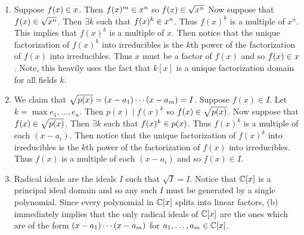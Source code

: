 \documentclass[letterpaper, 11pt, oneside]{book}
\begin{document}
\begin{sol}\label{ex:UAG_1.1.7}
  \begin{enumerate}
    \item Suppose $f(x) \in \ideal{x}$.
          Then $f(x)^{m} \in \ideal{x^{n}}$ so $f(x) \in \sqrt{\ideal{x^{n}}}$
          Now suppose that $f(x) \in \sqrt{\ideal{x^{n}}}$.
          Then $\exists k$ such that $f(x)^{k} \in \ideal{x^{n}}$.
          Thus $f(x)^{k}$ is a multiple of $x^{n}$.
          This implies that $f(x)^{k}$ is a multiple of $x$.
          Then notice that the unique factorization of $f(x)^{k}$ into irreducibles is the $k$th power of the factorization of $f(x)$ into irreducibles.
          Thus $x$ must be a factor of $f(x)$ and so $f(x) \in \ideal{x}$.
          Note, this heavily uses the fact that $k[x]$ is a unique factorization domain for all fields $k$.
    \item We claim that $\sqrt{\ideal{p(x)}} = \ideal{(x - a_{1}) \cdots (x - a_{m})} = I$.
          Suppose $f(x) \in I$.
          Let $k = \max{e_{1}, \ldots, e_{n}}$.
          Then $p(x) \mid f(x)^{k}$ so $f(x) \in \sqrt{\ideal{p(x)}}$.
          Now suppose that $f(x) \in \sqrt{\ideal{p(x)}}$.
          Then $\exists k$ such that $f(x)^{k} \in \ideal{p(x)}$.
          Thus $f(x)^{k}$ is a multiple of each $(x - a_{i})$.
          Then notice that the unique factorization of $f(x)^{k}$ into irreducibles is the $k$th power of the factorization of $f(x)$ into irreducibles.
          Thus $f(x)$ is a multiple of each $(x - a_{i})$ and so $f(x) \in I$.
    \item Radical ideals are the ideals $I$ such that $\sqrt{I} = I$.
          Notice that $\mathbb{C}[x]$ is a principal ideal domain and so any such $I$ must be generated by a single polynomial.
          Since every polynomial in $\mathbb{C}[x]$ splits into linear factors, (b) immediately implies that the only radical ideals of $\mathbb{C}[x]$ are the ones which are of the form $\ideal{(x - a_{1}) \cdots (x - a_{m})}$ for $a_{1}, \ldots, a_{m} \in \mathbb{C}[x]$.
  \end{enumerate}
\end{sol}

\clearpage
\end{document}
